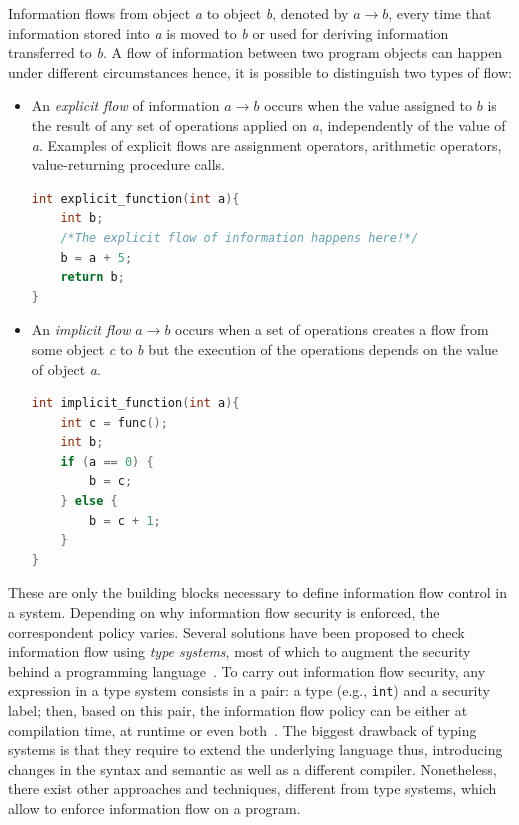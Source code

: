\documentclass[LaM,binding=0.6cm]{sapthesis}
\begin{document}
Information flows from object \textit{a} to object \textit{b}, denoted by $a \rightarrow b$, every time that information stored into \textit{a} is moved to \textit{b} or used for deriving information transferred to \textit{b}. A flow of information between two program objects can happen under different circumstances hence, it is possible to distinguish two types of flow:
\begin{itemize}
\item An \textit{explicit flow} of information $a \rightarrow b$ occurs when the value assigned to $b$ is the result of any set of operations applied on \textit{a}, independently of the value of \textit{a}. Examples of explicit flows are assignment operators, arithmetic operators, value-returning procedure calls.
\begin{lstlisting}[language=C++, caption=Example of explicit flow where the value of variable \texttt{b} is the result of an addition operation involving variable \texttt{a}.]
int explicit_function(int a){
	int b;
	/*The explicit flow of information happens here!*/
	b = a + 5;
	return b;
}
\end{lstlisting}
\item An \textit{implicit flow} $a \rightarrow b$ occurs when a set of operations creates a flow from some object \textit{c} to \textit{b} but the execution of the operations depends on the value of object \textit{a}.
\begin{lstlisting}[language=C++, caption=Example of implicit flow where the value assumed by variable \texttt{b} depends on the actual value of variable \texttt{a}.]
int implicit_function(int a){
	int c = func();
	int b;
	if (a == 0) {
		b = c;
	} else {
		b = c + 1;
	}
}
\end{lstlisting}
\end{itemize}
These are only the building blocks necessary to define information flow control in a system. Depending on why information flow security is enforced, the correspondent policy varies. Several solutions have been proposed to check information flow using \textit{type systems}, most of which to augment the security behind a programming language~\cite{malecha2010more}. To carry out information flow security, any expression in a type system consists in a pair: a type (e.g., \texttt{int}) and a security label; then, based on this pair, the information flow policy can be either at compilation time, at runtime or even both~\cite{sabelfeld2003language}.
\newpage
The biggest drawback of typing systems is that they require to extend the underlying language thus, introducing changes in the syntax and semantic as well as a different compiler. Nonetheless, there exist other approaches and techniques, different from type systems, which allow to enforce information flow on a program.
\end{document}
